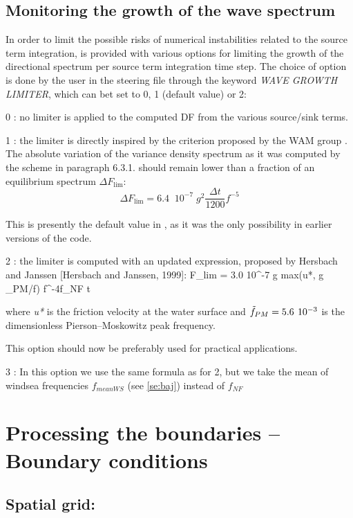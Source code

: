 \subsection{ Monitoring the growth of the wave spectrum }

 In order to limit the possible risks of numerical instabilities related to the source term integration, \tomawac is provided with various options for limiting the growth of the directional spectrum per source term integration time step. The choice of option is done by the user in the steering file through the keyword\textit{ WAVE GROWTH LIMITER}, which can bet set to 0, 1 (default value) or 2:

 0 : no limiter is applied to the computed DF from the various source/sink terms.

 1 : the limiter is directly inspired by the criterion proposed by the WAM group \cite{Wamdi1988}. The absolute variation of the variance density spectrum as it was computed by the scheme in paragraph 6.3.1. should remain lower than a fraction of an equilibrium spectrum $\Delta F_{\lim }$:
\begin{equation} \label{GrindEQ__6_24_}
\Delta F_{\lim } =6.4\; \; 10^{-7} \; g^{2} \frac{\Delta t}{1200} f^{-5}
\end{equation}

 This is presently the default value in \tomawac, as it was the only possibility in earlier versions of the code.

 2 : the limiter is computed with an updated expression, proposed by Hersbach and Janssen [Hersbach and Janssen, 1999]:
\bequ
\Delta F_{lim} = 3.0 10^{-7} g max(u*, g _{PM}/f) f^{-4}f_{NF} \Delta t
\eequ

 where \textit{u*} is the friction velocity at the water surface and $\tilde{f}_{PM} =5.6{\kern 1pt} \; 10^{-3} $ is the dimensionless Pierson--Moskowitz peak frequency.

 This option should now be preferably used for practical applications.

 3 : In this option we use the same formula as for 2, but we take the mean of windsea frequencies $f_{meanWS}$ (see \ref{se:baj}) instead of $f_{NF}$

\section{ Processing the boundaries -- Boundary conditions}

\subsection{ Spatial grid:}

